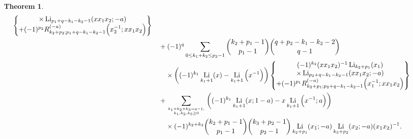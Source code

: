 \documentclass[11pt]{article}
\DeclareMathOperator{\Li}{Li}
\theoremstyle{plain}
\newtheorem{thm}{Theorem}[section]
\theoremstyle{definition}
\begin{document}
\begin{thm}
\begin{align}
\begin{Bmatrix}
		\times\Li_{p_{1}+q-k_1-k_2-1}(xx_1x_{2};-a)\\+(-1)^{p_{2}}R^{(-a)}_{k_2+p_2;p_{1}+q-k_1-k_2-1}\Big(x_{2}^{-1};xx_1x_2\Big)
	\end{Bmatrix}\nonumber\\
	&\quad+(-1)^q\sum_{0\le k_1+k_2\le p_{2}-1}\binom{k_2+p_{1}-1}{p_{1}-1}\binom{q+p_{2}-k_1-k_2-2}{q-1}\nonumber\\
	&\quad\quad\times\left((-1)^{k_1}\Li_{k_1+1}(x)-\Li_{k_1+1}\Big(x^{-1}\Big)\right)\begin{Bmatrix}
		(-1)^{k_2}(xx_1x_2)^{-1}\Li_{k_2+p_1}(x_{1})\\
		\times\Li_{p_{2}+q-k_1-k_2-1}(xx_1x_{2};-a)\\+(-1)^{p_{1}}R^{(-a)}_{k_2+p_1;p_{2}+q-k_1-k_2-1}\Big(x_{1}^{-1};xx_1x_2\Big)
	\end{Bmatrix}\nonumber\\
	&\quad+\sum_{k_1+k_2+k_3=q-1,\atop k_1,k_2,k_3\geq 0}\left((-1)^{k_1}\Li_{{k_1}+1}(x;1-a)-x \Li_{{k_1}+1}\Big(x^{-1};a\Big) \right)\nonumber\\
	&\quad\quad\times(-1)^{k_2+k_3}\binom{k_2+p_1-1}{p_1-1}\binom{k_3+p_2-1}{p_2-1}\Li_{k_2+p_1}(x_1;-a)\Li_{k_3+p_2}(x_2;-a)(x_1x_2)^{-1}.
	\end{align}
\end{thm}
\end{document}
